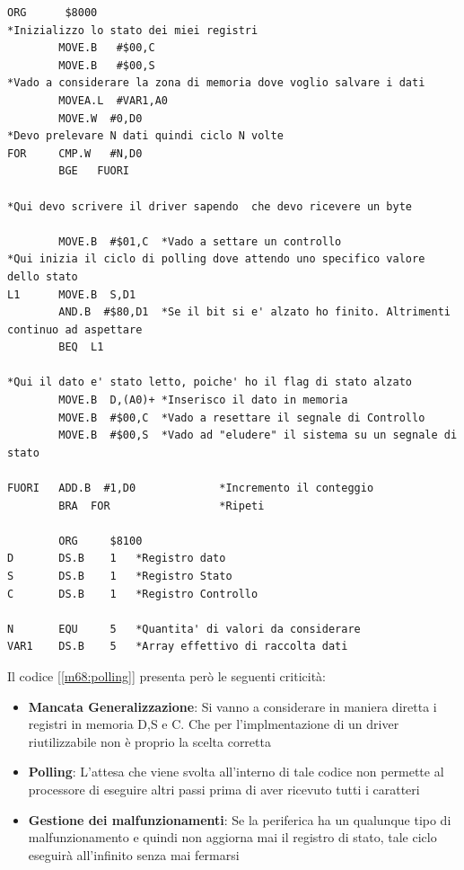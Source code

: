 \begin{lstlisting}[caption={Codice polling}, label=m68:polling]
        ORG      $8000
*Inizializzo lo stato dei miei registri
        MOVE.B   #$00,C
        MOVE.B   #$00,S
*Vado a considerare la zona di memoria dove voglio salvare i dati
        MOVEA.L  #VAR1,A0
        MOVE.W  #0,D0
*Devo prelevare N dati quindi ciclo N volte
FOR     CMP.W   #N,D0
        BGE   FUORI

*Qui devo scrivere il driver sapendo  che devo ricevere un byte

        MOVE.B  #$01,C  *Vado a settare un controllo
*Qui inizia il ciclo di polling dove attendo uno specifico valore dello stato
L1      MOVE.B  S,D1
        AND.B  #$80,D1  *Se il bit si e' alzato ho finito. Altrimenti continuo ad aspettare
        BEQ  L1  

*Qui il dato e' stato letto, poiche' ho il flag di stato alzato
        MOVE.B  D,(A0)+ *Inserisco il dato in memoria
        MOVE.B  #$00,C  *Vado a resettare il segnale di Controllo
        MOVE.B  #$00,S  *Vado ad "eludere" il sistema su un segnale di stato

FUORI   ADD.B  #1,D0             *Incremento il conteggio
        BRA  FOR                 *Ripeti
        
        ORG     $8100
D       DS.B    1   *Registro dato
S       DS.B    1   *Registro Stato
C       DS.B    1   *Registro Controllo

N       EQU     5   *Quantita' di valori da considerare
VAR1    DS.B    5   *Array effettivo di raccolta dati
\end{lstlisting}
\newpage
Il codice [\ref{m68:polling}] presenta però le seguenti criticità:
\begin{itemize}
    \item \textbf{Mancata Generalizzazione}: Si vanno a considerare in maniera diretta i registri in memoria D,S e C. Che per l'implmentazione di un driver riutilizzabile non è proprio la scelta corretta
    \item \textbf{Polling}: L'attesa che viene svolta all'interno di tale codice non permette al processore di eseguire altri passi prima di aver ricevuto tutti i caratteri
    \item \textbf{Gestione dei malfunzionamenti}: Se la periferica ha un qualunque tipo di malfunzionamento e quindi non aggiorna mai il registro di stato, tale ciclo eseguirà all'infinito senza mai fermarsi
\end{itemize}

